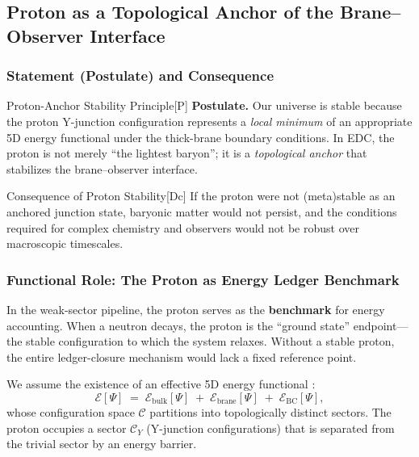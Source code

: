 
\subsection{Proton as a Topological Anchor of the Brane--Observer Interface}
\label{sec:proton_anchor}

\subsubsection{Statement (Postulate) and Consequence}

\begin{edcPostulateBox}{Proton-Anchor Stability Principle}{[P]}
\textbf{Postulate.} Our universe is stable because the proton Y-junction configuration represents
a \emph{local minimum} of an appropriate 5D energy functional under the thick-brane boundary conditions.
In EDC, the proton is not merely ``the lightest baryon''; it is a \emph{topological anchor} that stabilizes
the brane--observer interface.
\end{edcPostulateBox}

\begin{edcPropositionBox}{Consequence of Proton Stability}{[Dc]}
If the proton were not (meta)stable as an anchored junction state,
baryonic matter would not persist, and the conditions required for complex chemistry and observers
would not be robust over macroscopic timescales.
\end{edcPropositionBox}

\subsubsection{Functional Role: The Proton as Energy Ledger Benchmark}

In the weak-sector pipeline, the proton serves as the \textbf{benchmark} for energy accounting.
When a neutron decays, the proton is the ``ground state'' endpoint---the stable configuration
to which the system relaxes. Without a stable proton, the entire ledger-closure mechanism
would lack a fixed reference point.

We assume the existence of an effective 5D energy functional \tagP{}:
\begin{equation}
\label{eq:5d_energy_functional}
\mathcal{E}[\Psi] \;=\; \mathcal{E}_{\mathrm{bulk}}[\Psi] \;+\; \mathcal{E}_{\mathrm{brane}}[\Psi] \;+\; \mathcal{E}_{\mathrm{BC}}[\Psi],
\end{equation}
whose configuration space $\mathcal{C}$ partitions into topologically distinct sectors.
The proton occupies a sector $\mathcal{C}_Y$ (Y-junction configurations) that is separated
from the trivial sector by an energy barrier.

